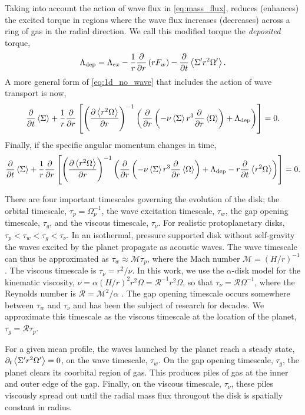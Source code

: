 Taking into account the action of wave flux in \eqref{eq:mass_flux}, reduces (enhances) the excited torque in regions where the wave flux increases (decreases) across a ring of gas in the radial direction. We call this modified torque the \emph{deposited} torque, 
\begin{equation}
\Lambda_\text{dep} = \Lambda_{ex} - \delr{F_w} - \pderiv{t} \avg{ \Sigma' r^2 \Omega'} .
\end{equation}
A more general form of \eqref{eq:1d_no_wave} that includes the action of wave transport is now,
\begin{equation}
\pderiv{t} \avg{\Sigma} + \frac{1}{r} \pderiv{r} \left[ \left( \ppderiv{\avg{r^2 \Omega}}{r} \right)^{-1} \left( \pderiv{r} \left( - \nu \avg{\Sigma} r^3 \pderiv{r} \avg{\Omega} \right) + \Lambda_\text{dep} \right) \right] = 0 .
\end{equation}
Finally, if the specific angular momentum changes in time,
\begin{equation}
\pderiv{t} \avg{\Sigma} + \frac{1}{r} \pderiv{r} \left[ \left( \ppderiv{\avg{r^2 \Omega}}{r} \right)^{-1} \left( \pderiv{r} \left( - \nu \avg{\Sigma} r^3 \pderiv{r} \avg{\Omega} \right) + \Lambda_\text{dep}  - r \pderiv{t} \avg{r^2 \Omega} \right)\right] = 0 .
\end{equation}

There are four important timescales governing the evolution of the disk; the orbital timescale, $\tau_p = \Omega_p^{-1}$,  the wave excitation timescale, $\tau_w$, the gap opening timescale, $\tau_g$, and the viscous timescale, $\tau_\nu$. For realistic protoplanetary disks, $\tau_p < \tau_w < \tau_g < \tau_\nu$. In an isothermal, pressure supported disk without self-gravity the waves excited by the planet propagate as acoustic waves. The wave timescale can thus be approximated as $\tau_w \approx \mathcal{M} \tau_p$, where the Mach number $\mathcal{M} = (H/r)^{-1}$. The viscous timescale is $\tau_\nu = r^2 / \nu$. In this work, we use the $\alpha$-disk model for the kinematic viscosity, $\nu  = \alpha \left(H/r\right)^2 r^2 \Omega =  \mathcal{R}^{-1} r^2 \Omega$, so that $\tau_\nu = \mathcal{R} \Omega^{-1}$, where the Reynolds number is $\mathcal{R}= \mathcal{M}^2 / \alpha$ \citep{1973A&A....24..337S}. The gap opening timescale occurs somewhere between $\tau_w$ and $\tau_\nu$ and has been the subject of research for decades. We approximate this timescale as the viscous timescale at the location of the planet, $\tau_g = \mathcal{R} \tau_p$. 

For a given mean profile, the waves launched by the planet reach a steady state, $\partial_t \left\langle  \Sigma' r^2 \Omega' \right\rangle = 0$, on the wave timescale, $\tau_w$. On the gap opening timescale, $\tau_g$, the planet clears its coorbital region of gas. This produces piles of gas at the inner and outer edge of the gap. Finally, on the viscous timescale, $\tau_\nu$, these piles viscously spread out until the radial mass flux througout the  disk is spatially constant in radius. 




